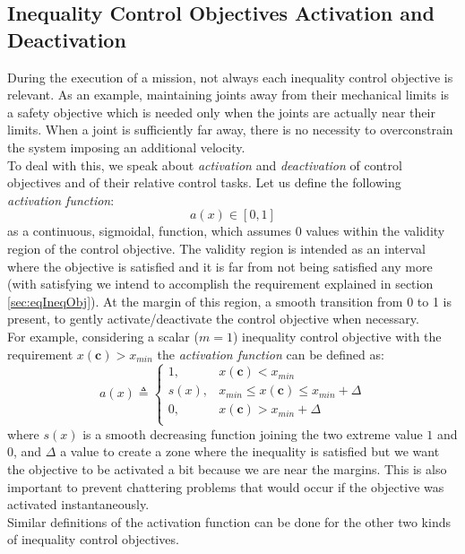 \subsection{Inequality Control Objectives Activation and Deactivation}
\label{sec:activations}
During the execution of a mission, not always each inequality control objective is relevant. As an example, maintaining joints away from their mechanical limits is a safety objective which is needed only when the joints are actually near their limits. When a joint is sufficiently far away, there is no necessity to overconstrain the system imposing an additional velocity.\\
To deal with this, we speak about \textit{activation} and \textit{deactivation} of control objectives and of their relative control tasks.
Let us define the following \textit{activation function}:
\begin{equation}
	a(x) \in [0,1]
\end{equation}
as a continuous, sigmoidal, function, which assumes $0$ values within the validity region of the control objective. The validity region is intended as an interval where the objective is satisfied and it is far from not being satisfied any more (with satisfying we intend to accomplish the requirement explained in section \ref{sec:eqIneqObj}). At the margin of this region, a smooth transition from 0 to 1 is present, to gently activate/deactivate the control objective when necessary.\\
For example, considering a scalar ($ m = 1 $) inequality control objective with the requirement $x(\boldsymbol{c}) > x_{min}$ the \textit{activation function} can be defined as:
\begin{equation}
	\label{eq_activation_f}
	a(x) \triangleq
	\begin{cases}1,& x(\boldsymbol{c}) < x_{min}\\
	s(x),& x_{min} \leq x(\boldsymbol{c}) \leq x_{min} + \Delta\\
	0, & x(\boldsymbol{c}) > x_{min} + \Delta\\
	\end{cases}
\end{equation}    
where $s(x)$ is a smooth decreasing function joining the two extreme value $1$ and $0$, and $\Delta$ a value to create a zone where the inequality is satisfied but we want the objective to be activated a bit because we are near the margins. This is also important to prevent chattering problems that would occur if the objective was activated instantaneously.\\
Similar definitions of the activation function can be done for the other two kinds of inequality control objectives.\\

